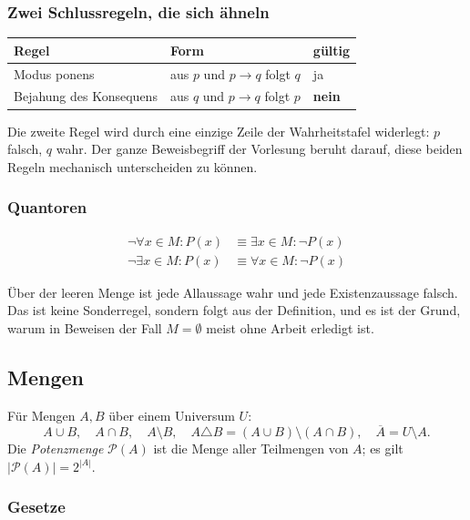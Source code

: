 \documentclass[12pt, a4paper]{article}
\begin{document}
\subsubsection{Zwei Schlussregeln, die sich ähneln}

\begin{center}
\begin{tabular}{lll}
\toprule
Regel & Form & gültig\\
\midrule
Modus ponens & aus $p$ und $p \to q$ folgt $q$ & ja\\
Bejahung des Konsequens & aus $q$ und $p \to q$ folgt $p$ & \textbf{nein}\\
\bottomrule
\end{tabular}
\end{center}

Die zweite Regel wird durch eine einzige Zeile der Wahrheitstafel widerlegt:
$p$ falsch, $q$ wahr. Der ganze Beweisbegriff der Vorlesung beruht darauf,
diese beiden Regeln mechanisch unterscheiden zu können.

\subsubsection{Quantoren}

\begin{align*}
  \neg \forall x \in M: P(x) &\equiv \exists x \in M: \neg P(x)\\
  \neg \exists x \in M: P(x) &\equiv \forall x \in M: \neg P(x)
\end{align*}

Über der leeren Menge ist jede Allaussage wahr und jede Existenzaussage
falsch. Das ist keine Sonderregel, sondern folgt aus der Definition, und es
ist der Grund, warum in Beweisen der Fall $M = \emptyset$ meist ohne Arbeit
erledigt ist.

\subsection{Mengen}

\begin{definitionbox}
Für Mengen $A, B$ über einem Universum $U$:
\[
  A \cup B, \quad A \cap B, \quad A \setminus B, \quad
  A \triangle B = (A \cup B) \setminus (A \cap B), \quad
  \overline{A} = U \setminus A.
\]
Die \emph{Potenzmenge} $\mathcal{P}(A)$ ist die Menge aller Teilmengen von
$A$; es gilt $|\mathcal{P}(A)| = 2^{|A|}$.
\end{definitionbox}

\subsubsection{Gesetze}
\end{document}
